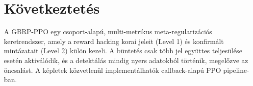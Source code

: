 \documentclass{article}
\begin{document}
\section{Következtetés}

A GBRP-PPO egy csoport-alapú, multi-metrikus meta-regularizációs keretrendszer, amely a reward hacking korai jeleit (Level 1) és konfirmált mintázatait (Level 2) külön kezeli. A büntetés csak több jel együttes teljesülése esetén aktiválódik, és a detektálás mindig nyers adatokból történik, megelőzve az öncsalást. A képletek közvetlenül implementálhatók callback-alapú PPO pipeline-ban.
\end{document}
